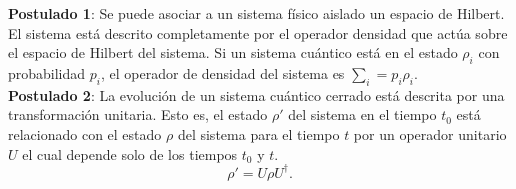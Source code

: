 \textbf{Postulado 1}: Se puede asociar a un sistema físico aislado un espacio de Hilbert. El sistema está descrito completamente por el operador densidad que actúa sobre el espacio de Hilbert del sistema. Si un sistema cuántico está en el estado $\rho_{i}$ con probabilidad $p_{i}$, el operador de densidad del sistema es $\sum_{i}= p_{i} \rho_{i}$.
\\

\textbf{Postulado 2}: La evolución de un sistema cuántico cerrado está descrita por una transformación unitaria. Esto es,  el estado $\rho'$ del sistema en el tiempo $t_{0}$ está relacionado con el estado $\rho$ del sistema para el tiempo $t$ por un operador unitario $U$ el cual depende solo de los tiempos $t_{0}$ y $t$. 
\begin{equation}
\rho' = U \rho U^{\dagger}.
\end{equation}
\\

